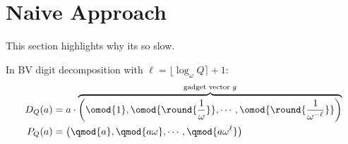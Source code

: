 \section{Naive Approach}
This section highlights why its so slow.

In BV digit decomposition with $\ell = \lfloor\log_{\omega}{Q} \rceil + 1$:
\begin{align*}
    D_{Q}({a}) &= a\cdot\overbrace{\left(\omod{1}, \omod{\round{\frac{1}{\omega}}}, \cdots, \omod{\round{\frac{1}{\omega^{-\ell}}}}  \right)}^{\text{gadget vector } g} \\
    P_{Q}({a}) &= \left(\qmod{a}, \qmod{a\omega}, \cdots, \qmod{a\omega^{\ell}}  \right)
\end{align*}

